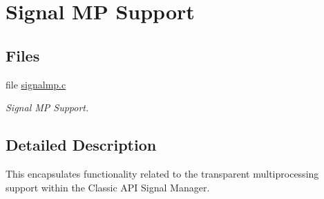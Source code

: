 \hypertarget{group__ClassicSignalMP}{}\section{Signal MP Support}
\label{group__ClassicSignalMP}
\subsection*{Files}
\begin{DoxyCompactItemize}
\item 
file \mbox{\hyperlink{signalmp_8c}{signalmp.\+c}}
\begin{DoxyCompactList}\small\item\em Signal MP Support. \end{DoxyCompactList}\end{DoxyCompactItemize}


\subsection{Detailed Description}
This encapsulates functionality related to the transparent multiprocessing support within the Classic A\+PI Signal Manager. 